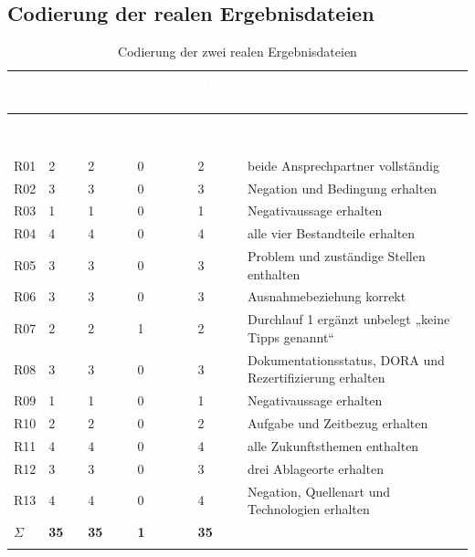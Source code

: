 \documentclass[
  10pt,
  ngerman,
  a4paper,
  toc=graduated,
  numbers=noenddot,
  headings=standardclasses,
  nonumberlist
]{scrartcl}
\begin{document}
\subsection{Codierung der realen Ergebnisdateien}
\label{anhang_codierung_real}

\small
\begin{longtable}{L{0.8cm}C{1.4cm}C{1.4cm}C{1.4cm}C{1.4cm}L{8.3cm}}
\toprule
{}
\textcolor{white}{\textbf{ID}} & \textcolor{white}{\textbf{Ref.}} & \textcolor{white}{\textbf{Abd. 1}} & \textcolor{white}{\textbf{Unbel. 1}} & \textcolor{white}{\textbf{Abd. 2}} & \textcolor{white}{\textbf{Kommentar}}\\
\midrule
\endfirsthead
\toprule
{}
\textcolor{white}{\textbf{ID}} & \textcolor{white}{\textbf{Ref.}} & \textcolor{white}{\textbf{Abd. 1}} & \textcolor{white}{\textbf{Unbel. 1}} & \textcolor{white}{\textbf{Abd. 2}} & \textcolor{white}{\textbf{Kommentar}}\\
\midrule
\endhead
R01 & 2 & 2 & 0 & 2 & beide Ansprechpartner vollständig\\
R02 & 3 & 3 & 0 & 3 & Negation und Bedingung erhalten\\
R03 & 1 & 1 & 0 & 1 & Negativaussage erhalten\\
R04 & 4 & 4 & 0 & 4 & alle vier Bestandteile erhalten\\
R05 & 3 & 3 & 0 & 3 & Problem und zuständige Stellen enthalten\\
R06 & 3 & 3 & 0 & 3 & Ausnahmebeziehung korrekt\\
R07 & 2 & 2 & 1 & 2 & Durchlauf 1 ergänzt unbelegt „keine Tipps genannt“\\
R08 & 3 & 3 & 0 & 3 & Dokumentationsstatus, DORA und Rezertifizierung erhalten\\
R09 & 1 & 1 & 0 & 1 & Negativaussage erhalten\\
R10 & 2 & 2 & 0 & 2 & Aufgabe und Zeitbezug erhalten\\
R11 & 4 & 4 & 0 & 4 & alle Zukunftsthemen enthalten\\
R12 & 3 & 3 & 0 & 3 & drei Ablageorte erhalten\\
R13 & 4 & 4 & 0 & 4 & Negation, Quellenart und Technologien erhalten\\
\midrule
\textbf{$\Sigma$} & \textbf{35} & \textbf{35} & \textbf{1} & \textbf{35} & \\
\bottomrule
\caption{Codierung der zwei realen Ergebnisdateien}
\label{tab:codierung_real}
\end{longtable}
\normalsize
\end{document}

